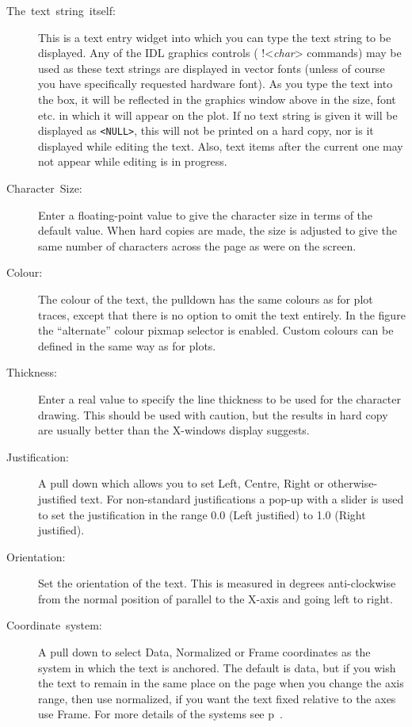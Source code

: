 \documentclass[11pt,twoside,english]{article}
\begin{document}
\begin{description}
\item [The~text~string~itself:]This is a text entry widget into which
  you can type the text string to be displayed. Any of the IDL graphics
  controls ( !<\textit{char}> commands) may be used as these text
  strings are displayed in vector fonts (unless of course you have
  specifically requested hardware font). As you type the text into the
  box, it will be reflected in the graphics window above in the size,
  font etc. in which it will appear on the plot. If no text string is
  given it will be displayed as \texttt{<NULL>}, this will not be
  printed on a hard copy, nor is it displayed while editing the
  text. Also, text items after the current one may not appear while
  editing is in progress.
\item [Character~Size:]Enter a floating-point value to give the
  character size in terms of the default value. When hard copies are
  made, the size is adjusted to give the same number of characters
  across the page as were on the screen.
\item [Colour:]The colour of the text, the pulldown has the same
  colours as for plot traces, except that there is no option to omit
  the text entirely. In the figure the ``alternate'' colour pixmap
  selector is enabled. Custom colours can be defined in the same way
  as for plots.
\item [Thickness:]Enter a real value to specify the line thickness
  to be used for the character drawing. This should be used with
  caution, but the results in hard copy are usually better than the
  X-windows display suggests.
\item [Justification:]A pull down which allows you to set Left, Centre,
  Right or otherwise-justified text. For non-standard justifications a
  pop-up with a slider is used to set the justification in the range
  0.0 (Left justified) to 1.0 (Right justified).
\item [Orientation:]Set the orientation of the text. This is measured
  in degrees anti-clockwise from the normal position of parallel to the
  X-axis and going left to right.
\item [Coordinate~system:]A pull down to select Data, Normalized or
  Frame coordinates as the system in which the text is anchored. The
  default is data, but if you wish the text to remain in the same place
  on the page when you change the axis range, then use normalized, if
  you want the text fixed relative to the axes use Frame. For more
  details of the systems see p~\pageref{coordsys}.

\end{description}
\end{document}
